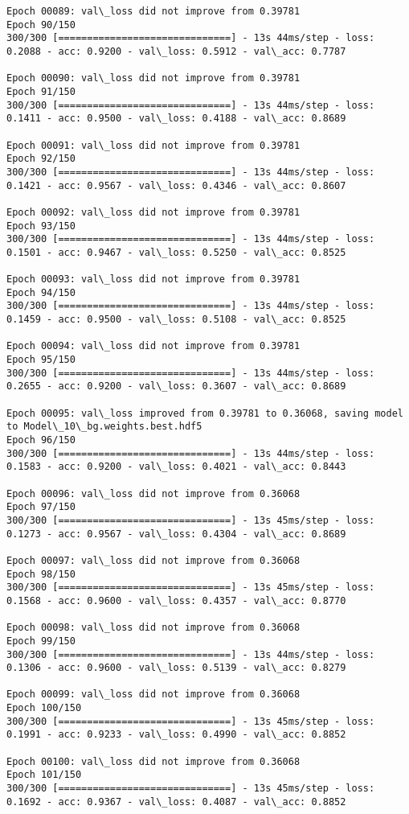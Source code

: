 \documentclass[11pt]{article}
\begin{document}
\begin{Verbatim}[commandchars=\\\{\}]
Epoch 00089: val\_loss did not improve from 0.39781
Epoch 90/150
300/300 [==============================] - 13s 44ms/step - loss: 0.2088 - acc: 0.9200 - val\_loss: 0.5912 - val\_acc: 0.7787

Epoch 00090: val\_loss did not improve from 0.39781
Epoch 91/150
300/300 [==============================] - 13s 44ms/step - loss: 0.1411 - acc: 0.9500 - val\_loss: 0.4188 - val\_acc: 0.8689

Epoch 00091: val\_loss did not improve from 0.39781
Epoch 92/150
300/300 [==============================] - 13s 44ms/step - loss: 0.1421 - acc: 0.9567 - val\_loss: 0.4346 - val\_acc: 0.8607

Epoch 00092: val\_loss did not improve from 0.39781
Epoch 93/150
300/300 [==============================] - 13s 44ms/step - loss: 0.1501 - acc: 0.9467 - val\_loss: 0.5250 - val\_acc: 0.8525

Epoch 00093: val\_loss did not improve from 0.39781
Epoch 94/150
300/300 [==============================] - 13s 44ms/step - loss: 0.1459 - acc: 0.9500 - val\_loss: 0.5108 - val\_acc: 0.8525

Epoch 00094: val\_loss did not improve from 0.39781
Epoch 95/150
300/300 [==============================] - 13s 44ms/step - loss: 0.2655 - acc: 0.9200 - val\_loss: 0.3607 - val\_acc: 0.8689

Epoch 00095: val\_loss improved from 0.39781 to 0.36068, saving model to Model\_10\_bg.weights.best.hdf5
Epoch 96/150
300/300 [==============================] - 13s 44ms/step - loss: 0.1583 - acc: 0.9200 - val\_loss: 0.4021 - val\_acc: 0.8443

Epoch 00096: val\_loss did not improve from 0.36068
Epoch 97/150
300/300 [==============================] - 13s 45ms/step - loss: 0.1273 - acc: 0.9567 - val\_loss: 0.4304 - val\_acc: 0.8689

Epoch 00097: val\_loss did not improve from 0.36068
Epoch 98/150
300/300 [==============================] - 13s 45ms/step - loss: 0.1568 - acc: 0.9600 - val\_loss: 0.4357 - val\_acc: 0.8770

Epoch 00098: val\_loss did not improve from 0.36068
Epoch 99/150
300/300 [==============================] - 13s 44ms/step - loss: 0.1306 - acc: 0.9600 - val\_loss: 0.5139 - val\_acc: 0.8279

Epoch 00099: val\_loss did not improve from 0.36068
Epoch 100/150
300/300 [==============================] - 13s 45ms/step - loss: 0.1991 - acc: 0.9233 - val\_loss: 0.4990 - val\_acc: 0.8852

Epoch 00100: val\_loss did not improve from 0.36068
Epoch 101/150
300/300 [==============================] - 13s 45ms/step - loss: 0.1692 - acc: 0.9367 - val\_loss: 0.4087 - val\_acc: 0.8852


\end{Verbatim}
\end{document}
